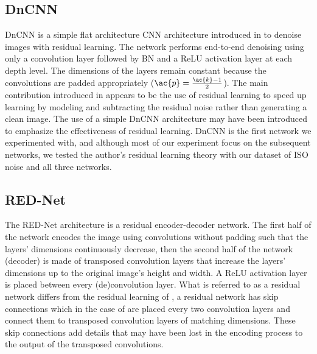 \subsection{DnCNN}
DnCNN is a simple flat architecture \ac{CNN} architecture introduced in \cite{dncnn} to denoise images with residual learning. The network performs end-to-end denoising using only a convolution layer followed by \ac{BN} and a \ac{ReLU} activation layer at each depth level. The dimensions of the layers remain constant because the convolutions are padded appropriately ($\ac{p}={\ac{k}-1\over{2}}$). %
The main contribution introduced in \cite{dncnn} appears to be the use of residual learning to speed up learning by modeling and subtracting the residual noise rather than generating a clean image. The use of a simple DnCNN architecture may have been introduced to emphasize the effectiveness of residual learning. DnCNN is the first network we experimented with, and although most of our experiment focus on the subsequent networks, we tested the author's residual learning theory with our dataset of ISO noise and all three networks.
\subsection{RED-Net}
The \ac{RED-Net} architecture is a residual encoder-decoder network. The first half of the network encodes the image using convolutions without padding such that the layers' dimensions continuously decrease, then the second half of the network (decoder) is made of transposed convolution layers that increase the layers' dimensions up to the original image's height and width. A \ac{ReLU} activation layer is placed between every (de)convolution layer. What is referred to as a residual network differs from the residual learning of \cite{dncnn}, a residual network has skip connections which in the case of \cite{rednet} are placed every two convolution layers and connect them to transposed convolution layers of matching dimensions. These skip connections add details that may have been lost in the encoding process to the output of the transposed convolutions. 
